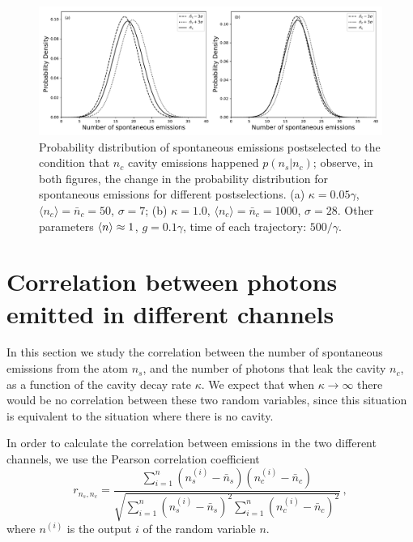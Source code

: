 \documentclass[epj,final]{svjour}
\begin{document}
\begin{center}
\begin{figure}
\begin{center}
\includegraphics[scale = 0.5]{lastgraph1.pdf}
\caption{Probability distribution of spontaneous emissions
  postselected to the condition that $n_c$ cavity emissions happened
  $p(n_s|n_c)$; observe, in both figures, the change in the
  probability distribution for spontaneous emissions for different
  postselections. (a) $\kappa = 0.05\gamma$,
  $\langle n_c\rangle=\bar{n}_c=50$, $\sigma=7$; (b) 
  $\kappa = 1.0$, $\langle n_c\rangle=\bar{n}_c=1000$, $\sigma=28$.
  Other parameters $\expval{n} \approx 1$, $g =0.1\gamma$,
  time of each trajectory: $500/\gamma$. } \label{probdisult}
\end{center}
\end{figure}
\end{center}


\section{Correlation between photons emitted in different channels}\label{sc:correlation}
In this section we study the correlation between the number of
spontaneous emissions from the atom $n_s$, and the number of photons
that leak the cavity $n_c$, as a function of the cavity decay rate
$\kappa$. We expect that when $\kappa\rightarrow\infty$ there would be
no correlation between these two random variables, since this
situation is equivalent to the situation where there is no
cavity.

In order to calculate the correlation between emissions in the two
different channels, we use the Pearson correlation coefficient
\cite{benesty2009pearson}
\begin{equation} 
r_{n_s,n_c} = \frac{\sum\limits_{i=1}^n(n_s^{(i)} -
  \bar{n}_s)(n_c^{(i)} - \bar{n}_c)}{\sqrt{\sum\limits_{i=1}^n(n_s^{(i)}
    - \bar{n}_s)^2\sum\limits_{i=1}^n(n_c^{(i)} - \bar{n}_c)^2}}\, ,  \label{correlationc}
\end{equation}
where $n^{(i)}$ is the output $i$ of the random variable $n$.
\end{document}
